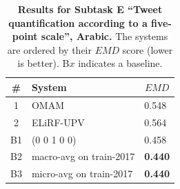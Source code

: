 \begin{table}[h!]
\centering
\begin{small}
\renewcommand{\arraystretch}{1.0}%
\begin{tabular}{|c|l|l|}
\hline
      \bf \# & \bf System & \multicolumn{1}{c|}{$EMD$} \\
\hline
1 & OMAM & 0.548 \\
2 & ELiRF-UPV & 0.564 \\
\hline
B1 & (0 0 1 0 0) & 0.458\\
B2 & macro-avg on train-2017 & \bf 0.440\\
B3 & micro-avg on train-2017 & \bf 0.440\\
\hline
\end{tabular}
\caption{\textbf{Results for Subtask E ``Tweet quantification according to a five-point scale'', Arabic.} The systems are ordered by their $EMD$ score (lower is better). B$x$ indicates a baseline.}
\label{table:ResultsSubtaskE:Arabic}
\end{small}
\end{table}

